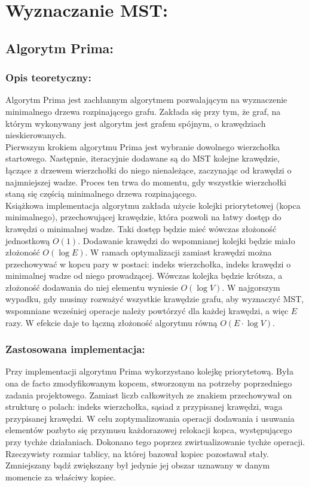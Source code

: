\documentclass[a4paper,12pt]{article}
\begin{document}
\section{Wyznaczanie MST:}

\subsection{Algorytm Prima:}

\subsubsection{Opis teoretyczny:}
Algorytm Prima jest zachłannym algorytmem pozwalającym na wyznaczenie minimalnego drzewa rozpinającego grafu. Zakłada się przy tym, że graf, na którym wykonywany jest algorytm jest grafem spójnym, o krawędziach nieskierowanych.\\

\noindent
Pierwszym krokiem algorytmu Prima jest wybranie dowolnego wierzchołka startowego. Następnie, iteracyjnie dodawane są do MST kolejne krawędzie, łączące z drzewem wierzchołki do niego nienależące, zaczynając od krawędzi o najmniejszej wadze. Proces ten trwa do momentu, gdy wszystkie wierzchołki staną się częścią minimalnego drzewa rozpinającego.\\

\noindent
Książkowa implementacja algorytmu zakłada użycie kolejki priorytetowej (kopca minimalnego), przechowującej krawędzie, która pozwoli na łatwy dostęp do krawędzi o minimalnej wadze. Taki dostęp będzie mieć wówczas złożoność jednostkową $O(1)$. Dodawanie krawędzi do wspomnianej kolejki będzie miało złożoność $O(\log E)$. W ramach optymalizacji zamiast krawędzi można przechowywać w kopcu pary w postaci: indeks wierzchołka, indeks krawędzi o minimalnej wadze od niego prowadzącej. Wówczas kolejka będzie krótsza, a złożoność dodawania do niej elementu wyniesie $O(\log V)$. W najgorszym wypadku, gdy musimy rozważyć wszystkie krawędzie grafu, aby wyznaczyć MST, wspomniane wcześniej operacje należy powtórzyć dla każdej krawędzi, a więc $E$ razy. W efekcie daje to łączną złożoność algorytmu równą $O(E \cdot \log V)$.

\subsubsection{Zastosowana implementacja:}
Przy implementacji algorytmu Prima wykorzystano kolejkę priorytetową. Była ona de facto zmodyfikowanym kopcem, stworzonym na potrzeby poprzedniego zadania projektowego. Zamiast liczb całkowitych ze znakiem przechowywał on strukturę o polach: indeks wierzchołka, sąsiad z przypisanej krawędzi, waga przypisanej krawędzi. W celu zoptymalizowania operacji dodawania i usuwania elementów pozbyto się przymusu każdorazowej relokacji kopca, występującego przy tychże działaniach. Dokonano tego poprzez zwirtualizowanie tychże operacji. Rzeczywisty rozmiar tablicy, na której bazował kopiec pozostawał stały. Zmniejszany bądź zwiększany był jedynie jej obszar uznawany w danym momencie za właściwy kopiec.\\
\end{document}
